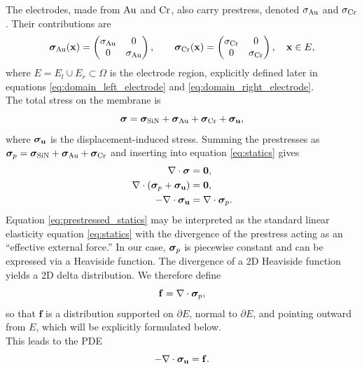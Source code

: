 The electrodes, made from $\mathrm{Au}$ and $\mathrm{Cr}$, also carry prestress, denoted $\sigma_{\mathrm{Au}}$ and $\sigma_{\mathrm{Cr}}$. Their contributions are
\begin{equation*}
    \boldsymbol{\sigma}_{\mathrm{Au}} (\mathbf{x} )= 
    \begin{pmatrix}
        \sigma_{\mathrm{Au}} & 0\\ 
        0 & \sigma_{\mathrm{Au}}
    \end{pmatrix}, \qquad
    \boldsymbol{\sigma}_{\mathrm{Cr}} (\mathbf{x} )= 
    \begin{pmatrix}
        \sigma_{\mathrm{Cr}} & 0\\ 
        0 & \sigma_{\mathrm{Cr}}
    \end{pmatrix},
    \quad \mathbf{x} \in E,
\end{equation*}
where $E = E_l \cup E_r \subset \Omega$ is the electrode region, explicitly defined later in equations \eqref{eq:domain_left_electrode} and \eqref{eq:domain_right_electrode}.\\

The total stress on the membrane is
\[
\boldsymbol{\sigma} = \boldsymbol{\sigma}_{\mathrm{SiN}} + \boldsymbol{\sigma}_{\mathrm{Au}} + \boldsymbol{\sigma}_{\mathrm{Cr}} + \boldsymbol{\sigma}_{\mathbf{u}},
\]
where $\boldsymbol{\sigma}_{\mathbf{u}}$ is the displacement-induced stress. Summing the prestresses as $\boldsymbol{\sigma}_p = \boldsymbol{\sigma}_{\mathrm{SiN}} + \boldsymbol{\sigma}_{\mathrm{Au}} + \boldsymbol{\sigma}_{\mathrm{Cr}}$ and inserting into equation \eqref{eq:statics} gives
\begin{align}
    \nabla\cdot\boldsymbol{\sigma} &= \mathbf{0}, \nonumber \\
    \nabla\cdot(\boldsymbol{\sigma}_p+\boldsymbol{\sigma}_{\mathbf{u}}) &= \mathbf{0}, \nonumber \\
    -\nabla\cdot\boldsymbol{\sigma}_{\mathbf{u}} &= \nabla\cdot\boldsymbol{\sigma}_p. 
    \label{eq:prestressed_statics}
\end{align}
Equation \eqref{eq:prestressed_statics} may be interpreted as the standard linear elasticity equation \eqref{eq:statics} with the divergence of the prestress acting as an “effective external force.” In our case, $\boldsymbol{\sigma}_p$ is piecewise constant and can be expressed via a Heaviside function. The divergence of a 2D Heaviside function yields a 2D delta distribution. We therefore define
\[
\mathbf{f} = \nabla\cdot\boldsymbol{\sigma}_p,
\]
so that $\mathbf{f}$ is a distribution supported on $\partial E$, normal to $\partial E$, and pointing outward from $E$, which will be explicitly formulated below.\\

This leads to the PDE
\begin{equation*}
    -\nabla\cdot\boldsymbol{\sigma}_{\mathbf{u}} = \mathbf{f}.
\end{equation*}

